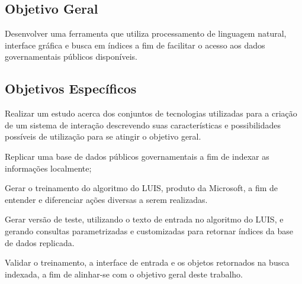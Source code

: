\subsection{Objetivo Geral}
Desenvolver uma ferramenta que utiliza processamento de linguagem natural, interface gráfica e busca em índices a fim de facilitar o acesso aos dados governamentais públicos disponíveis.

\subsection{Objetivos Específicos}
Realizar um estudo acerca dos conjuntos de tecnologias utilizadas para a criação de um sistema de interação descrevendo suas características e possibilidades possíveis de utilização para se atingir o objetivo geral.

Replicar uma base de dados públicos governamentais a fim de indexar as informações localmente;

Gerar o treinamento do algoritmo do LUIS, produto da Microsoft, a fim de entender e diferenciar ações diversas a serem realizadas.

Gerar versão de teste, utilizando o texto de entrada no algoritmo do LUIS, e gerando consultas parametrizadas e customizadas para retornar índices da base de dados replicada.

Validar o treinamento, a interface de entrada e os objetos retornados na busca indexada, a fim de alinhar-se com o objetivo geral deste trabalho.
